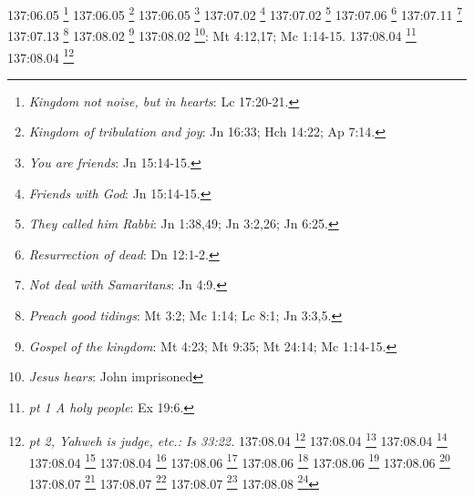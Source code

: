 {{{{{{{{{{{{{{{{{{{{{{{{{{{{{{{{{{137:06.05 \footnote{\textit{Kingdom not noise, but in hearts}: Lc 17:20-21.}
137:06.05 \footnote{\textit{Kingdom of tribulation and joy}: Jn 16:33; Hch 14:22; Ap 7:14.}
137:06.05 \footnote{\textit{You are friends}: Jn 15:14-15.}
137:07.02 \footnote{\textit{Friends with God}: Jn 15:14-15.}
137:07.02 \footnote{\textit{They called him Rabbi}: Jn 1:38,49; Jn 3:2,26; Jn 6:25.}
137:07.06 \footnote{\textit{Resurrection of dead}: Dn 12:1-2.}
137:07.11 \footnote{\textit{Not deal with Samaritans}: Jn 4:9.}
137:07.13 \footnote{\textit{Preach good tidings}: Mt 3:2; Mc 1:14; Lc 8:1; Jn 3:3,5.}
137:08.02 \footnote{\textit{Gospel of the kingdom}: Mt 4:23; Mt 9:35; Mt 24:14; Mc 1:14-15.}
137:08.02 \footnote{\textit{Jesus hears}: John imprisoned}: Mt 4:12,17; Mc 1:14-15.}
137:08.04 \footnote{\textit{pt 1 A holy people}: Ex 19:6.}
137:08.04 \footnote{\textit{pt 2, Yahweh is judge, etc.: Is 33:22.}
137:08.04 \footnote{\textit{pt 3, Yahweh is king, God}: Sal 84:3.}
137:08.04 \footnote{\textit{pt 4 He is a great king}: Sal 47:2.}
137:08.04 \footnote{\textit{pt 5 Loving-kindness}: Sal 138:2.}
137:08.04 \footnote{\textit{pt 6 Blessed be glory of Lord}: Ez 3:12.}
137:08.04 \footnote{\textit{pt 7 For he is our king}: Sal 89:18.}
137:08.06 \footnote{\textit{Love and mercy over all}: Ef 2:4.}
137:08.06 \footnote{\textit{No respecter of persons}: 2 Cr 19:7; Job 34:19; Eclo 35:12; Hch 10:34; Ro 2:11; Gl 2:6; Gl 3:28; Ef 6:9; Col 3:11.}
137:08.06 \footnote{\textit{Proclaim setting up of kingdom}: Mt 3:2; Mt 4:17,23; Mt 5:3,10,19-20; Mt 6:33; Mt 7:21; Mt 8:11; Mt 9:35; Mt 10:7; Mt 11:11-12; Mt 12:28; Mt 13:11,14,31-52; Mt 16:19; Mt 18:1-4,23; Mt 19:14,23-24; Mt 20:1; Mt 21:31,43; Mt 22:2; Mt 23:13; Mt 24:14; Mt 25:1,14; Mc 1:14-15; Mc 4:11,26,30; Mc 9:1,47; Mc 10:14-15,23-25; Mc 12:34; Mc 14:25; Mc 15:43; Lc 4:43; Lc 6:20; Lc 7:28; Lc 8:1,10; Lc 9:2,11,27; Lc 9:60,62; Lc 10:9-11; Lc 11:20; Lc 12:31-32; Lc 13:18,20,28,29; Lc 14:15; Lc 16:16; Lc 17:20-21; Lc 18:16-17,24-25; Lc 19:11; Lc 21:31; Lc 22:16,18; Lc 23:51; Jn 3:3,5; Ro 14:17; 1 Co 4:20; 1 Co 6:9-10.}
137:08.06 \footnote{\textit{Universal kingdom}: 1 Co 12:33.}
137:08.07 \footnote{\textit{Kingdom not of this world}: Jn 18:36.}
137:08.07 \footnote{\textit{Spirit of Truth & Thought Adjuster}: Jn 17:21-23.}
137:08.07 \footnote{\textit{Spirit of Truth}: Ez 11:19; Ez 18:31; Ez 36:26-27; Jl 2:28-29; Lc 24:49; Jn 7:39; Jn 14:16-18,23,26; Jn 15:4,26; Jn 16:6-8,13-14; Jn 17:21-23; Hch 1:5,8a; Hch 2:1-4,16-18; Hch 2:33; 2 Co 13:5; Gl 2:20; Gl 4:6; Ef 1:13; Ef 4:30; 1 Jn 4:12-15.}
137:08.08 \footnote{\textit{Faith as a little child}: Mt 18:2-4; Mt 19:13-14; Mc 9:36-37; Mc 10:13-15; Lc 9:47-48; Lc 18:17.}
}}}}}}}}}}}}}}}}}}}}}}}}}}}}}}}}}}

